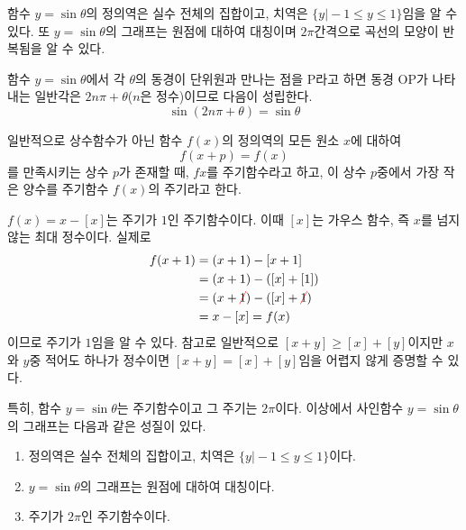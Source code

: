 \documentclass[11pt, a4paper]{book}
\begin{document}
\begin{figure}[H]
\begin{center}
	\end{center}
\end{figure}

함수 $y=\sin \theta$의 정의역은 실수 전체의 집합이고, 치역은 $\{ y \vert -1 \le y \le 1\}$임을 알 수 있다. 또 $y=\sin\theta$의 그래프는 원점에 대하여 대칭이며 $2\pi$간격으로 곡선의 모양이 반복됨을 알 수 있다. 

함수 $y=\sin\theta$에서 각 $\theta$의 동경이 단위원과 만나는 점을 \textrm{P}라고 하면 동경 \textrm{OP}가 나타내는 일반각은 $2n \pi +\theta$($n$은 정수)이므로 다음이 성립한다.
\[
\sin\left(2n\pi +\theta\right) =\sin\theta
\]

일반적으로 상수함수가 아닌 함수 $f(x)$의 정의역의 모든 원소 $x$에 대하여 
\[
f(x+p) = f(x)
\]
를 만족시키는 상수 $p$가 존재할 때, $fx$를 {\color{red}주기함수}라고 하고, 이 상수 $p$중에서 가장 작은 양수를 주기함수 $f(x)$의 {\color{red}주기}라고 한다.
\begin{sample}
	$f(x) = x-[x]$는 주기가 $1$인 주기함수이다. 이때 $[x]$는 가우스 함수, 즉 $x$를 넘지 않는 최대 정수이다. 실제로
	\begin{align*}
		f(x+1) & = (x+1) - [x+1] \\
		&= (x+1) - ([x]+[1]) \\
		&= (x+\Ccancel[red]{1}) - ([x]+\Ccancel[red]{1})\\
		& = x - [x] =f(x)
	\end{align*}
이므로 주기가 $1$임을 알 수 있다. 참고로 일반적으로 $[x+y] \ge [x]+[y]$이지만 $x$와 $y$중 적어도 하나가 정수이면 $[x+y]=[x]+[y]$임을 어렵지 않게 증명할 수 있다.
\end{sample}

특히, 함수 $y = \sin\theta$는 주기함수이고 그 주기는 $2\pi$이다.  이상에서 사인함수 $y=\sin\theta$의 그래프는 다음과 같은 성질이 있다.
\vspace{1em}
\begin{theorem}[사인함수 $y=\sin\theta$의 그래프의 성질]
	\begin{enumerate}[label=(\arabic*)]
		\item 정의역은 실수 전체의 집합이고, 치역은 $\{y \vert -1 \le y \le 1\}$이다.
		\item $y=\sin\theta$의 그래프는 원점에 대하여 대칭이다.
		\item 주기가 $2\pi$인 주기함수이다.
	\end{enumerate}
\end{theorem}
\end{document}
